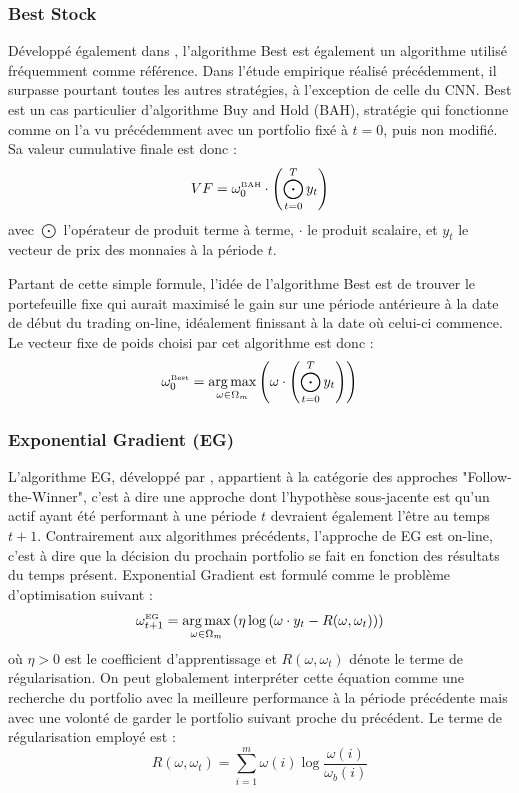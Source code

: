 \documentclass[a4paper, 10pt]{article}
\DeclareMathOperator*{\argmax}{arg\,max}
\begin{document}
\subsubsection{Best Stock}
\label{sec:theorie_best}

Développé également dans \cite{Cover1991}, l'algorithme Best est également un algorithme utilisé fréquemment comme référence. Dans l'étude empirique réalisé précédemment, il surpasse pourtant toutes les autres stratégies, à l'exception de celle du CNN. Best est un cas particulier d'algorithme Buy and Hold (BAH), stratégie qui fonctionne comme on l'a vu précédemment avec un portfolio fixé à $t=0$, puis non modifié. Sa valeur cumulative finale est donc :
\begin{equation}
    VF = \omega_0^{\text{\tiny BAH}} \cdot \left( \bigodot_{t=0}^{T} y_t \right)
\end{equation}
avec $\bigodot$ l'opérateur de produit terme à terme, $\cdot$ le produit scalaire, et $y_t$ le vecteur de prix des monnaies à la période $t$.

Partant de cette simple formule, l'idée de l'algorithme Best est de trouver le portefeuille fixe qui aurait maximisé le gain sur une période antérieure à la date de début du trading on-line, idéalement finissant à la date où celui-ci commence. Le vecteur fixe de poids choisi par cet algorithme est donc :
\begin{equation}
    \omega_0^{\text{\tiny Best}} = \argmax_{\omega \in \Omega_m} \left( \omega \cdot \left(\bigodot_{t=0}^{T} y_t \right)\right)
\end{equation}

\subsubsection{Exponential Gradient (EG)}
\label{sec:theorie_etude_eg}

L'algorithme EG, développé par \citet{Helmbold1998}, appartient à la catégorie des approches "Follow-the-Winner", c'est à dire une approche dont l'hypothèse sous-jacente est qu'un actif ayant été performant à une période $t$ devraient également l'être au temps $t+1$. Contrairement aux algorithmes précédents, l'approche de EG est on-line, c'est à dire que la décision du prochain portfolio se fait en fonction des résultats du temps présent. Exponential Gradient est formulé comme le problème d'optimisation suivant :
\begin{equation}
    \omega_{t+1}^{\text{\tiny EG}} = \argmax_{\omega \in \Omega_m} \left( \eta \log \left(\omega \cdot y_t - R(\omega, \omega_t) \right) \right)
\end{equation}
où $\eta > 0$ est le coefficient d'apprentissage et $R(\omega, \omega_t)$ dénote le terme de régularisation. On peut globalement interpréter cette équation comme une recherche du portfolio avec la meilleure performance à la période précédente mais avec une volonté de garder le portfolio suivant proche du précédent. Le terme de régularisation employé est : 
\begin{equation}
    R(\omega, \omega_t) = \sum_{i=1}^{m} \omega(i) \log \frac{\omega(i)}{\omega_{b}(i)}
\end{equation}
\end{document}
